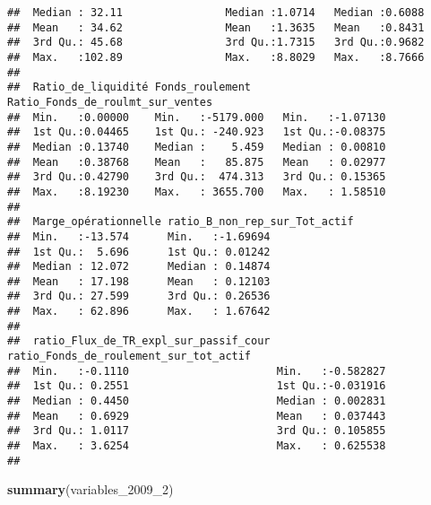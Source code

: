 \documentclass[
]{article}
\newenvironment{Shaded}{\begin{snugshade}}{\end{snugshade}}
\newcommand{\DecValTok}[1]{\textcolor[rgb]{0.00,0.00,0.81}{#1}}
\newcommand{\KeywordTok}[1]{\textcolor[rgb]{0.13,0.29,0.53}{\textbf{#1}}}
\newcommand{\NormalTok}[1]{#1}
\begin{document}
\begin{verbatim}
##  Median : 32.11                Median :1.0714   Median :0.6088         
##  Mean   : 34.62                Mean   :1.3635   Mean   :0.8431         
##  3rd Qu.: 45.68                3rd Qu.:1.7315   3rd Qu.:0.9682         
##  Max.   :102.89                Max.   :8.8029   Max.   :8.7666         
##                                                                        
##  Ratio_de_liquidité Fonds_roulement     Ratio_Fonds_de_roulmt_sur_ventes
##  Min.   :0.00000    Min.   :-5179.000   Min.   :-1.07130                
##  1st Qu.:0.04465    1st Qu.: -240.923   1st Qu.:-0.08375                
##  Median :0.13740    Median :    5.459   Median : 0.00810                
##  Mean   :0.38768    Mean   :   85.875   Mean   : 0.02977                
##  3rd Qu.:0.42790    3rd Qu.:  474.313   3rd Qu.: 0.15365                
##  Max.   :8.19230    Max.   : 3655.700   Max.   : 1.58510                
##                                                                         
##  Marge_opérationnelle ratio_B_non_rep_sur_Tot_actif
##  Min.   :-13.574      Min.   :-1.69694             
##  1st Qu.:  5.696      1st Qu.: 0.01242             
##  Median : 12.072      Median : 0.14874             
##  Mean   : 17.198      Mean   : 0.12103             
##  3rd Qu.: 27.599      3rd Qu.: 0.26536             
##  Max.   : 62.896      Max.   : 1.67642             
##                                                    
##  ratio_Flux_de_TR_expl_sur_passif_cour ratio_Fonds_de_roulement_sur_tot_actif
##  Min.   :-0.1110                       Min.   :-0.582827                     
##  1st Qu.: 0.2551                       1st Qu.:-0.031916                     
##  Median : 0.4450                       Median : 0.002831                     
##  Mean   : 0.6929                       Mean   : 0.037443                     
##  3rd Qu.: 1.0117                       3rd Qu.: 0.105855                     
##  Max.   : 3.6254                       Max.   : 0.625538                     
## 
\end{verbatim}

\begin{Shaded}
\begin{Highlighting}[]
\KeywordTok{summary}\NormalTok{(variables_}\DecValTok{2009}\NormalTok{_}\DecValTok{2}\NormalTok{)}
\end{Highlighting}
\end{Shaded}
\end{document}
